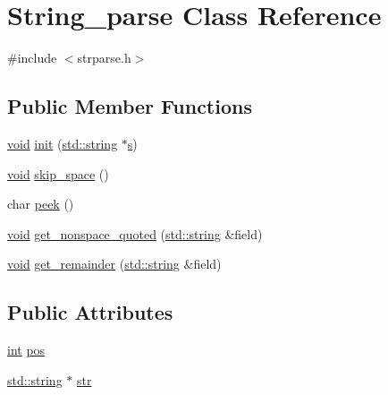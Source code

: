 \hypertarget{class_string__parse}{}\section{String\+\_\+parse Class Reference}
\label{class_string__parse}


{\ttfamily \#include $<$strparse.\+h$>$}

\subsection*{Public Member Functions}
\begin{DoxyCompactItemize}
\item 
\hyperlink{sound_8c_ae35f5844602719cf66324f4de2a658b3}{void} \hyperlink{class_string__parse_aa425cd2a6e7624c163bf47759021df84}{init} (\hyperlink{test__lib_f_l_a_c_2format_8c_ab02026ad0de9fb6c1b4233deb0a00c75}{std\+::string} $\ast$\hyperlink{lib_2expat_8h_a755339d27872b13735c2cab829e47157}{s})
\item 
\hyperlink{sound_8c_ae35f5844602719cf66324f4de2a658b3}{void} \hyperlink{class_string__parse_a58017f7adb718b285f809b231d567eb0}{skip\+\_\+space} ()
\item 
char \hyperlink{class_string__parse_afc0f021c5f016622cf028419975e93e1}{peek} ()
\item 
\hyperlink{sound_8c_ae35f5844602719cf66324f4de2a658b3}{void} \hyperlink{class_string__parse_a8ef81f317a2cf643e8a6579592bfa163}{get\+\_\+nonspace\+\_\+quoted} (\hyperlink{test__lib_f_l_a_c_2format_8c_ab02026ad0de9fb6c1b4233deb0a00c75}{std\+::string} \&field)
\item 
\hyperlink{sound_8c_ae35f5844602719cf66324f4de2a658b3}{void} \hyperlink{class_string__parse_aaf02e1b47c9ba9cd712d7719917bfe09}{get\+\_\+remainder} (\hyperlink{test__lib_f_l_a_c_2format_8c_ab02026ad0de9fb6c1b4233deb0a00c75}{std\+::string} \&field)
\end{DoxyCompactItemize}
\subsection*{Public Attributes}
\begin{DoxyCompactItemize}
\item 
\hyperlink{xmltok_8h_a5a0d4a5641ce434f1d23533f2b2e6653}{int} \hyperlink{class_string__parse_a47afb639351d5f028bf4f50caabf6c20}{pos}
\item 
\hyperlink{test__lib_f_l_a_c_2format_8c_ab02026ad0de9fb6c1b4233deb0a00c75}{std\+::string} $\ast$ \hyperlink{class_string__parse_ac1cbfaa0a933dd95eb77032682e22c41}{str}
\end{DoxyCompactItemize}


